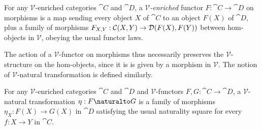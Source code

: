 \begin{definition}
\label{def:cmon-enriched:enriched-functor}
For any $\mathscr{V}$-enriched categories $\cat{C}$ and $\cat{D}$, a \emph{$\mathscr{V}$-enriched} functor $F:
\cat{C} \to \cat{D}$ on morphisms is a map sending every object $X$ of $\cat{C}$ to an object $F(X)$ of
$\cat{D}$, plus a family of morphisms $F_{X,Y}: {\mathcal{C}}(X,Y) \to {\mathcal{D}}(F(X),F(Y))$ between
hom-objects in $\mathscr{V}$, obeying the usual functor laws.
\end{definition}

\noindent The action of a $\mathscr{V}$-functor on morphisms thus necessarily preserves the
$\mathscr{V}$-structure on the hom-objects, since it is is given by a morphism in $\mathscr{V}$. The notion of
$\mathscr{V}$-natural transformation is defined similarly.

\begin{definition}
For any $\mathscr{V}$-enriched categories $\cat{C}$ and $\cat{D}$ and $\mathscr{V}$-functors $F, G: \cat{C}
\to \cat{D}$, a {$\mathscr{V}$-natural transformation} $\eta: F \naturalto G$ is a family of morphisms
$\eta_X: F(X) \to G(X)$ in $\cat{D}$ satisfying the usual naturality square for every $f: X \to Y$ in
$\cat{C}$. 
\end{definition}

%
%

